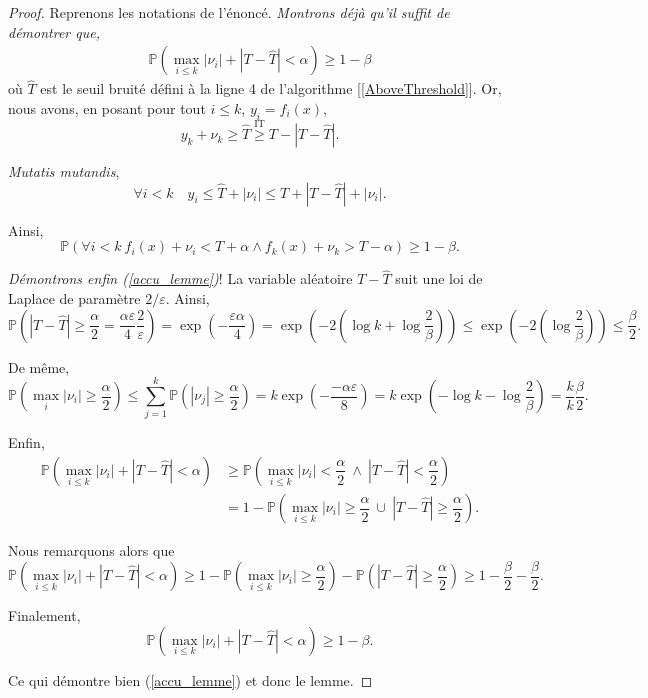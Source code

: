 \begin{proof}
    Reprenons les notations de l'énoncé. \textit{Montrons déjà qu'il suffit de démontrer que,}
    \begin{align}
        \label{accu_lemme}
        \mathbb P\left( \max_{i \leq k} |\nu_i| + |T - \hat T| < \alpha  \right)  \geq 1 - \beta
    \end{align}
    où \(\hat T\) est le seuil bruité défini à la ligne 4 de l'algorithme [\ref{AboveThreshold}]. Or, nous avons, en posant pour tout \(i \leq k\), \(y_i = f_i(x)\),
    \[
        y_k + \nu_k \geq \hat T \overset{\text{IT}}{\geq} T - |T-\hat T|.
    \]

    \textit{Mutatis mutandis},
    \[
        \forall i < k \quad y_i \leq \hat T + |\nu_i| \leq T + |T - \hat T| + |\nu_i|.  
    \]

    Ainsi,
    \[
        \mathbb P \left( \forall i < k \  f_i(x) + \nu_i < T + \alpha \wedge f_k(x) + \nu_k > T - \alpha \right) \geq 1 - \beta.
    \]

    \textit{Démontrons enfin (\ref{accu_lemme})}! La variable aléatoire \(T-\hat T\) suit une loi de {\sc Laplace} de paramètre \(2/\varepsilon\). Ainsi,
    \[
        \mathbb P \left( |T - \hat T| \geq \dfrac{\alpha}{2} = \dfrac{\alpha \varepsilon}{4}\dfrac{2}{\varepsilon} \right) = \exp\left( -\dfrac{\varepsilon \alpha}{4} \right) = \exp\left( -2\left( \log k + \log \dfrac{2}{\beta} \right) \right) \leq \exp\left( -2\left(\log \dfrac{2}{\beta} \right) \right) \leq \dfrac{\beta}{2}.
    \]

    De même,
    \[
        \mathbb P \left( \max_{i} |\nu_i| \geq \dfrac{\alpha}{2} \right) \leq \sum\limits_{j = 1}^k \mathbb P \left( |\nu_j| \geq \dfrac{\alpha}{2} \right) = k \exp\left( -\dfrac{-\alpha\varepsilon}{8} \right) = k \exp\left( -\log k - \log\dfrac{2}{\beta} \right) = \dfrac{k}{k} \dfrac{\beta}{2}.
    \]

    Enfin, 
    \begin{align*}
        \mathbb P\left( \max_{i \leq k} |\nu_i| + |T - \hat T| < \alpha  \right) & \geq \mathbb P\left( \max_{i \leq k} |\nu_i| < \dfrac{\alpha}{2} \ \wedge \ |T - \hat T| < \dfrac{\alpha}{2} \right)\\
        & = 1 - \mathbb P\left( \max_{i \leq k} |\nu_i| \geq \dfrac{\alpha}{2} \ \cup \ |T - \hat T| \geq \dfrac{\alpha}{2} \right).
    \end{align*}

    Nous remarquons alors que 
    \[
        \mathbb P\left( \max_{i \leq k} |\nu_i| + |T - \hat T| < \alpha  \right) \geq 1 - \mathbb P\left( \max_{i \leq k} |\nu_i| \geq \dfrac{\alpha}{2}\right) - \mathbb P \left(|T - \hat T| \geq \dfrac{\alpha}{2} \right) \geq 1 - \dfrac{\beta}{2} - \dfrac{\beta}{2}.
    \]

    Finalement, 
    \[
        \mathbb P\left( \max_{i \leq k} |\nu_i| + |T - \hat T| < \alpha  \right)  \geq 1 - \beta.
    \]

    Ce qui démontre bien (\ref{accu_lemme}) et donc le lemme.
\end{proof}

